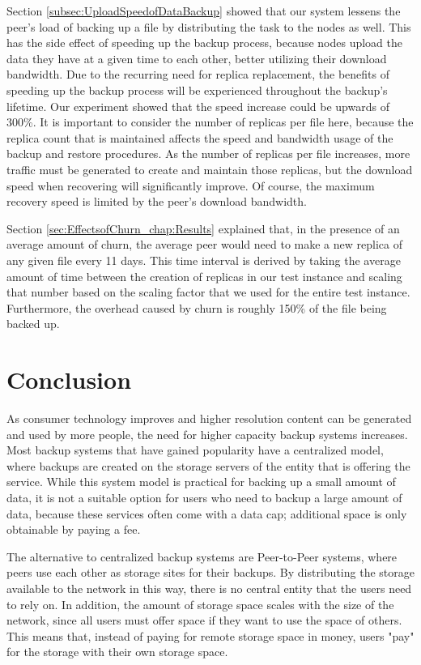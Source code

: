 \documentclass[12pt]{report}
\begin{document}
Section \ref{subsec:UploadSpeedofDataBackup} showed that our system lessens the peer's load of backing up a file by distributing the task to the nodes as well. This has the side effect of speeding up the backup process, because nodes upload the data they have at a given time to each other, better utilizing their download bandwidth. Due to the recurring need for replica replacement, the benefits of speeding up the backup process will be experienced throughout the backup's lifetime. Our experiment showed that the speed increase could be upwards of 300\%. It is important to consider the number of replicas per file here, because the replica count that is maintained affects the speed and bandwidth usage of the backup and restore procedures. As the number of replicas per file increases, more traffic must be generated to create and maintain those replicas, but the download speed when recovering will significantly improve. Of course, the maximum recovery speed is limited by the peer's download bandwidth.

Section \ref{sec:EffectsofChurn_chap:Results} explained that, in the presence of an average amount of churn, the average peer would need to make a new replica of any given file every 11 days. This time interval is derived by taking the average amount of time between the creation of replicas in our test instance and scaling that number based on the scaling factor that we used for the entire test instance. Furthermore, the overhead caused by churn is roughly 150\% of the file being backed up.

\chapter{Conclusion} \label{chap:Conclusion}

As consumer technology improves and higher resolution content can be generated and used by more people, the need for higher capacity backup systems increases. Most backup systems that have gained popularity have a centralized model, where backups are created on the storage servers of the entity that is offering the service. While this system model is practical for backing up a small amount of data, it is not a suitable option for users who need to backup a large amount of data, because these services often come with a data cap; additional space is only obtainable by paying a fee.

The alternative to centralized backup systems are Peer-to-Peer systems, where peers use each other as storage sites for their backups. By distributing the storage available to the network in this way, there is no central entity that the users need to rely on. In addition, the amount of storage space scales with the size of the network, since all users must offer space if they want to use the space of others. This means that, instead of paying for remote storage space in money, users "pay" for the storage with their own storage space.
\end{document}
